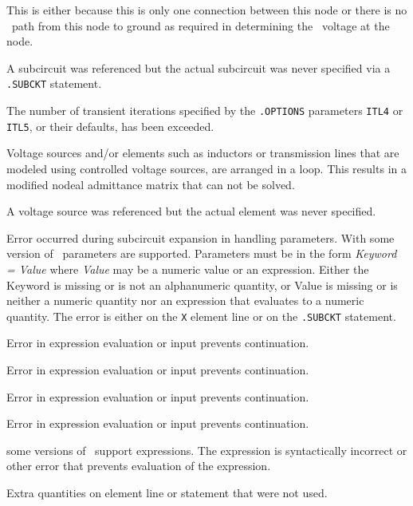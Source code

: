 This is either because this is only one connection between this node or there is
no \dc\ path from this node to ground as required in determining the \dc\ voltage
at the node.

A subcircuit was referenced but the actual subcircuit was never specified via a
{\tt .SUBCKT} statement.

The number of transient iterations
specified by the {\tt .OPTIONS} parameters {\tt ITL4} or {\tt ITL5}, or their
defaults, has been exceeded.

Voltage sources and/or elements such as inductors or transmission lines
that are modeled using controlled voltage sources, are arranged in a loop.
This results in a modified nodeal admittance matrix that can not be solved.

A voltage source was referenced but the actual element was never specified.

Error occurred during subcircuit expansion in handling parameters.
With some version of \spice\ parameters are supported.
Parameters must be in the form {\it Keyword = Value}
where {\it Value} may be a numeric value or an
expression.  Either the Keyword is missing or is not an alphanumeric quantity,
or Value is missing or is neither a numeric quantity nor an expression that
evaluates to a numeric quantity.  The error is either on the {\tt X} element
line or on the {\tt .SUBCKT} statement.

Error in expression evaluation or input prevents continuation.

Error in expression evaluation or input prevents continuation.

Error in expression evaluation or input prevents continuation.

Error in expression evaluation or input prevents continuation.

some versions of \spice\ support expressions.  The expression is syntactically
incorrect or other error that prevents evaluation of the expression.

Extra quantities on element line or statement that were not used.


